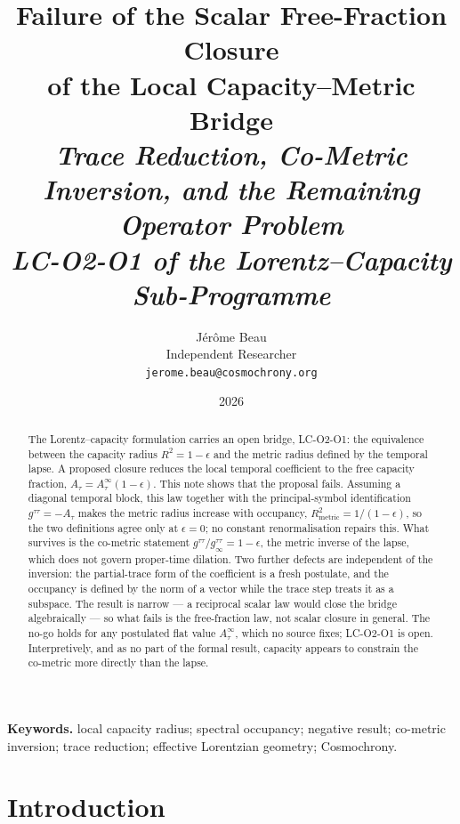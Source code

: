 \documentclass[12pt,a4paper]{article}
\title{Failure of the Scalar Free-Fraction Closure\\of the Local Capacity--Metric Bridge\\[4pt]
\normalsize\itshape Trace Reduction, Co-Metric Inversion, and the Remaining Operator Problem\\[4pt]
\normalsize\itshape LC-O2-O1 of the Lorentz--Capacity Sub-Programme}
\author{J\'er\^ome Beau\\[2pt]
\small Independent Researcher\\
\small \texttt{jerome.beau@cosmochrony.org}}
\date{2026}
\theoremstyle{remark}
\theoremstyle{definition}
\begin{document}
  \maketitle

  \begin{abstract}
    The Lorentz--capacity formulation carries an open bridge, LC-O2-O1: the equivalence between the
    capacity radius $R^{2}=1-\epsilon$ and the metric radius defined by the temporal lapse.
    A proposed closure reduces the local temporal coefficient to the free capacity fraction,
    $A_{\tau}=A_{\tau}^{\infty}(1-\epsilon)$.
    This note shows that the proposal fails.
    Assuming a diagonal temporal block, this law together with the principal-symbol identification
    $g^{\tau\tau}=-A_{\tau}$ makes the metric radius increase with occupancy,
    $R_{\mathrm{metric}}^{2}=1/(1-\epsilon)$, so the two definitions agree only at $\epsilon=0$; no
    constant renormalisation repairs this.
    What survives is the co-metric statement $g^{\tau\tau}/g^{\tau\tau}_{\infty}=1-\epsilon$, the
    metric inverse of the lapse, which does not govern proper-time dilation.
    Two further defects are independent of the inversion: the partial-trace form of the coefficient is
    a fresh postulate, and the occupancy is defined by the norm of a vector while the trace step
    treats it as a subspace.
    The result is narrow --- a reciprocal scalar law would close the bridge algebraically --- so what
    fails is the free-fraction law, not scalar closure in general.
    The no-go holds for any postulated flat value $A_{\tau}^{\infty}$, which no source fixes; LC-O2-O1 is open.
    Interpretively, and as no part of the formal result, capacity appears to constrain the co-metric
    more directly than the lapse.
  \end{abstract}

  \medskip
  {\sloppy
  \noindent\textbf{Keywords.}
  local capacity radius; spectral occupancy; negative result; co-metric inversion;
  trace reduction; effective Lorentzian geometry; Cosmochrony.\par}

  \newpage
  \tableofcontents

  \newpage
  \section{Introduction}
    \label{sec:introduction}
\end{document}
